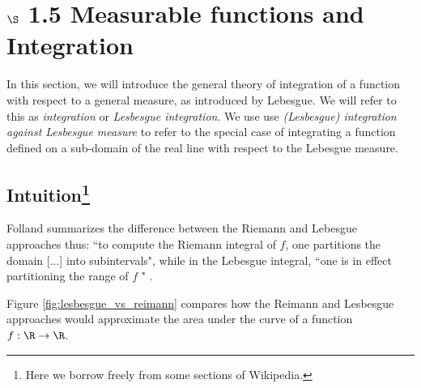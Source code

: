 \documentclass{article} %
\begin{document}

\section{$\S$ 1.5 Measurable functions and Integration}

In this section, we will introduce the general theory of integration of a function with respect to a general measure, as introduced by Lebesgue.  We will refer to this as \textit{integration} or \textit{Lesbesgue integration}. We use use \textit{(Lesbesgue) integration against Lesbesgue measure} to refer to the special case of integrating a function defined on a sub-domain of the real line with respect to the Lebesgue measure.   %

\subsection{Intuition\footnote{Here we borrow freely from some sections of Wikipedia.}} \label{sec:intuition_on_lesbesgue_integration}

Folland summarizes the difference between the Riemann and Lebesgue approaches thus: ``to compute the Riemann integral of $f$, one partitions the domain [...] into subintervals", while in the Lebesgue integral, ``one is in effect partitioning the range of $f$ " \cite{folland1999real}.

Figure \ref{fig:lesbesgue_vs_reimann} compares how the Reimann and Lesbesgue approaches would approximate the area under the curve of a function $f : \R \to \R$. 
\end{document}

